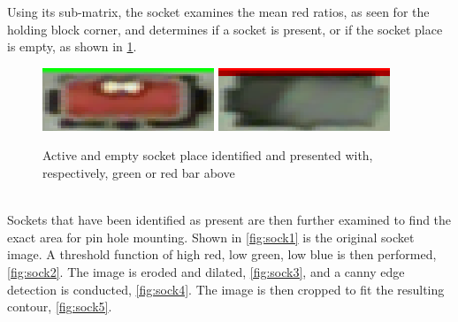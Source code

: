 \documentclass[11pt,a4paper]{report}
\begin{document}
Using its sub-matrix, the socket examines the mean red ratios, as seen for the holding block corner, and determines if a socket is present, or if the socket place is empty, as shown in \cref{fig:fullSock}.
\begin{figure}[h]
\hspace*{-.05\linewidth}
\includegraphics[width=0.5\linewidth]{fullSock}
\hspace*{0.05\linewidth}
\includegraphics[width=0.5\linewidth]{emptySock}
\caption{Active and empty socket place identified and presented with, respectively, green or red bar above}
\label{fig:fullSock}
\end{figure}\\

Sockets that have been identified as present are then further examined to find the exact area for pin hole mounting. Shown in \cref{fig:sock1} is the original socket image. A threshold function of high red, low green, low blue is then performed, \cref{fig:sock2}. The image is eroded and dilated, \cref{fig:sock3}, and a canny edge detection is conducted, \cref{fig:sock4}. The image is then cropped to fit the resulting contour, \cref{fig:sock5}.\\
\end{document}
